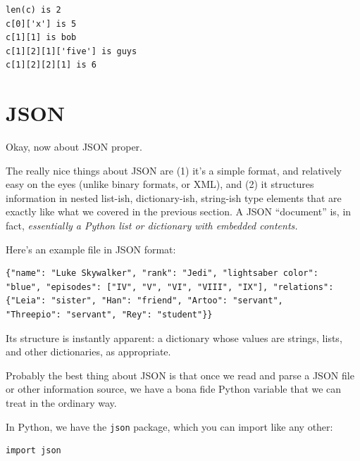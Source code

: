 \begin{Verbatim}[fontsize=\small,samepage=true,frame=leftline,framesep=5mm,framerule=1mm]
len(c) is 2
c[0]['x'] is 5
c[1][1] is bob
c[1][2][1]['five'] is guys
c[1][2][2][1] is 6
\end{Verbatim}


\bigskip

\section{JSON}


Okay, now about JSON proper.

The really nice things about JSON are (1) it's a simple format, and relatively
easy on the eyes (unlike binary formats, or XML), and (2) it structures
information in nested list-ish, dictionary-ish, string-ish type
elements that are exactly like what we covered in the previous section. A JSON
``document'' is, in fact, \textit{essentially a Python list or dictionary with
embedded contents.}

\medskip

Here's an example file in JSON format:


\begin{Verbatim}[fontsize=\footnotesize,samepage=true,frame=lines,framesep=3mm]
{"name": "Luke Skywalker", "rank": "Jedi", "lightsaber color":
"blue", "episodes": ["IV", "V", "VI", "VIII", "IX"], "relations":
{"Leia": "sister", "Han": "friend", "Artoo": "servant",
"Threepio": "servant", "Rey": "student"}}
\end{Verbatim}

Its structure is instantly apparent: a dictionary whose values are strings,
lists, and other dictionaries, as appropriate.

Probably the best thing about JSON is that once we read and parse a JSON file
or other information source, we have a bona fide Python variable that we can
treat in the ordinary way.

In Python, we have the \texttt{json} package, which you can import like any
other:

\begin{Verbatim}[fontsize=\small,samepage=true,frame=single,framesep=3mm]
import json
\end{Verbatim}


